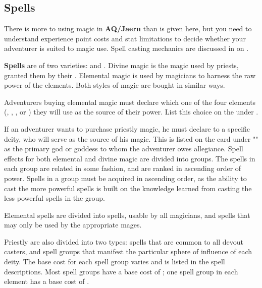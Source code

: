 \begin{multicols*}{2}
\section{Spells}
There is more to using magic in \textbf{AQ/Jaern} than is given here, but you need to understand experience point costs and stat limitations to decide whether your adventurer is suited to magic use. Spell casting mechanics are discussed in  on .

\textbf{Spells} are of two varieties:  and . Divine magic is the magic used by priests, granted them by their . Elemental magic is used by magicians to harness the raw power of the elements. Both styles of magic are bought in similar ways.

Adventurers buying elemental magic must declare which one of the four elements (, , , or ) they will use as the source of their power. List this choice on the  under .

If an adventurer wants to purchase priestly magic, he must declare  to a specific deity, who will serve as the source of his magic. This is listed on the card under "" as the primary god or goddess to whom the adventurer owes allegiance.
Spell effects for both elemental and divine magic are divided into groups. The spells in each group are related in some fashion, and are ranked in ascending order of power.
Spells in a group must be acquired in ascending order, as the ability to cast the more powerful spells is built on the knowledge learned from casting the less powerful spells in the group.

Elemental spells are divided into  spells, usable by all magicians, and  spells that may only be used by the appropriate mages.

Priestly  are also divided into two types:  spells that are common to all devout casters, and  spell groups that manifest the particular sphere of influence of each deity.
The base cost for each spell group varies and is listed in the spell descriptions. Most spell groups have a base cost of ; one spell group in each element has a base
cost of .

\end{multicols*}
